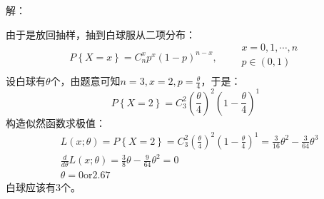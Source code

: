 解：

由于是放回抽样，抽到白球服从二项分布：
\[
P\left\{ X=x \right\} =C_{n}^{x}p^x\left( 1-p \right) ^{n-x},\qquad \begin{array}{l}
	x=0,1,\cdots ,n\\
	p\in \left( 0,1 \right)\\
\end{array}
\]
设白球有$\theta $个，由题意可知$n=3,x=2,p=\frac{\theta}{4}$，于是：
\[
P\left\{ X=2 \right\} =C_{3}^{2}\left( \frac{\theta}{4} \right) ^2\left( 1-\frac{\theta}{4} \right) ^1
\]
构造似然函数求极值：
\begin{align*}
&L\left( x;\theta \right) =P\left\{ X=2 \right\} =C_{3}^{2}\left( \frac{\theta}{4} \right) ^2\left( 1-\frac{\theta}{4} \right) ^1=\frac{3}{16}\theta ^2-\frac{3}{64}\theta ^3 \\
&\frac{d}{d\theta}L\left( x;\theta \right) =\frac{3}{8}\theta -\frac{9}{64}\theta ^2=0 \\
&\theta =0\mathrm{or}2.67
\end{align*}
白球应该有3个。




